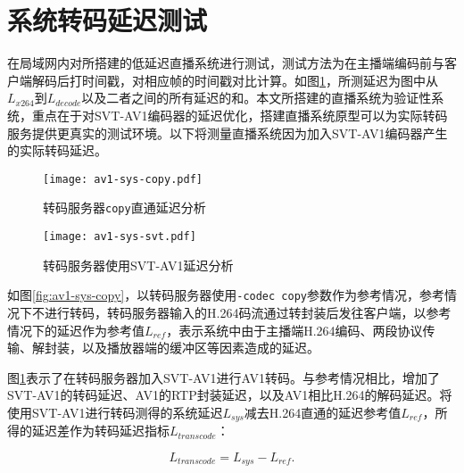 \section{系统转码延迟测试}
	在局域网内对所搭建的低延迟直播系统进行测试，测试方法为在主播端编码前与客户端解码后打时间戳，对相应帧的时间戳对比计算。如图\ref{fig:av1-sys-svt}，所测延迟为图中从$L_{x264}$到$L_{decode}$以及二者之间的所有延迟的和。本文所搭建的直播系统为验证性系统，重点在于对SVT-AV1编码器的延迟优化，搭建直播系统原型可以为实际转码服务提供更真实的测试环境。以下将测量直播系统因为加入SVT-AV1编码器产生的实际转码延迟。%

  \begin{figure}[htbp]
  	\begin{minipage}{0.495\textwidth}
	  	\centering
	  	\texttt{[image: av1-sys-copy.pdf]}
	  	\caption{转码服务器\texttt{copy}直通延迟分析}
	  	\label{fig:av1-sys-copy}
  	\end{minipage} \hfill
		\begin{minipage}{0.495\textwidth}
			\centering
			\texttt{[image: av1-sys-svt.pdf]}
			\caption{转码服务器使用SVT-AV1延迟分析}
			\label{fig:av1-sys-svt}
		\end{minipage}
	\end{figure}

  如图\ref{fig:av1-sys-copy}，以转码服务器使用\texttt{-codec copy}参数作为参考情况，参考情况下不进行转码，转码服务器输入的H.264码流通过转封装后发往客户端，以参考情况下的延迟作为参考值$L_{ref}$，表示系统中由于主播端H.264编码、两段协议传输、解封装，以及播放器端的缓冲区等因素造成的延迟。

  图\ref{fig:av1-sys-svt}表示了在转码服务器加入SVT-AV1进行AV1转码。与参考情况相比，增加了SVT-AV1的转码延迟、AV1的RTP封装延迟，以及AV1相比H.264的解码延迟。将使用SVT-AV1进行转码测得的系统延迟$L_{sys}$减去H.264直通的延迟参考值$L_{ref}$，所得的延迟差作为转码延迟指标$L_{transcode}$：

  \begin{equation}
  	L_{transcode} = L_{sys} - L_{ref}.
  \end{equation}

